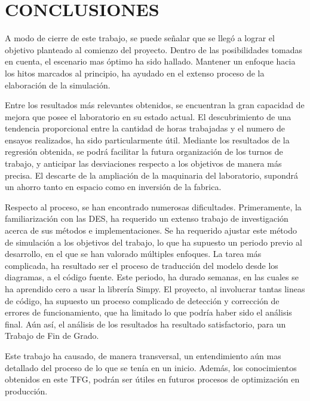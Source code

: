 
\section{CONCLUSIONES}

A modo de cierre de este trabajo,
se puede señalar que se llegó a lograr el objetivo planteado
al comienzo del proyecto.
Dentro de las posibilidades tomadas en cuenta,
el escenario mas óptimo ha sido hallado.
Mantener un enfoque hacia los hitos marcados al principio,
ha ayudado en el extenso proceso de la elaboración de la simulación.

Entre los resultados más relevantes obtenidos,
se encuentran la gran capacidad de mejora que posee el laboratorio
en su estado actual.
El descubrimiento de una tendencia proporcional
entre la cantidad de horas trabajadas
y el numero de ensayos realizados, ha sido particularmente útil.
Mediante los resultados de la regresión obtenida,
se podrá facilitar la futura organización de los turnos de trabajo,
y anticipar las desviaciones respecto a los objetivos de manera más precisa.
El descarte de la ampliación de la maquinaria del laboratorio,
supondrá un ahorro tanto en espacio como en inversión de la fabrica.

Respecto al proceso, se han encontrado numerosas dificultades.
Primeramente, la familiarización con las DES,
ha requerido un extenso trabajo de investigación
acerca de sus métodos e implementaciones.
Se ha requerido ajustar este método de simulación a los objetivos del trabajo,
lo que ha supuesto un periodo previo al desarrollo,
en el que se han valorado múltiples enfoques.
La tarea más complicada, ha resultado ser
el proceso de traducción del modelo desde los diagramas, a el código fuente.
Este periodo, ha durado semanas,
en las cuales se ha aprendido cero a usar la librería Simpy.
El proyecto, al involucrar tantas lineas de código,
ha supuesto un proceso complicado de
detección y corrección de errores de funcionamiento,
que ha limitado lo que podría haber sido el análisis final.
Aún así, el análisis de los resultados ha resultado satisfactorio,
para un Trabajo de Fin de Grado.

Este trabajo ha causado, de manera transversal,
un entendimiento aún mas detallado del proceso de lo que se tenía en un inicio.
Además, los conocimientos obtenidos en este TFG,
podrán ser útiles en futuros procesos de optimización en producción.
